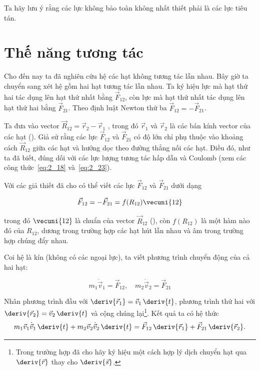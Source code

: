 Ta hãy lưu ý rằng các lực không bảo toàn không nhất thiết phải là các lực tiêu tán.

\section{Thế năng tương tác}\label{sec:3_6}

Cho đến nay ta đã nghiên cứu hệ các hạt không tương tác lẫn nhau. Bây giờ ta chuyển sang xét hệ gồm hai hạt tương tác lẫn nhau. Ta ký hiệu lực mà hạt thứ hai tác dụng lên hạt thứ nhất bằng $\vec{F}_{12}$, còn lực mà hạt thứ nhất tác dụng lên hạt thứ hai bằng $\vec{F}_{21}$. Theo định luật Newton thứ ba $\vec{F}_{12}=-\vec{F}_{21}$.

Ta đưa vào vector $\vec{R}_{12}=\vec{r}_2-\vec{r}_1$ , trong đó $\vec{r}_1$ và $\vec{r}_2$ là các bán kính vector của các hạt (). Giả sử rằng các lực $\vec{F}_{12}$ và $\vec{F}_{21}$ có độ lớn chỉ phụ thuộc vào khoảng cách $\vec{R}_12$ giữa các hạt và hướng dọc theo đường thẳng nối các hạt. Điều đó, như ta đã biết, đúng dối với các lực lượng tương tác hấp dẫn và Coulomb (xem các công thức~\eqref{eq:2_18} và~\eqref{eq:2_23}).

Với các giả thiết đã cho có thể viết các lực $\vec{F}_{12}$ và $\vec{F}_{21}$ dưới dạng 

\begin{equation}\label{eq:3_41}
\vec{F}_{12} = -\vec{F}_{21} = f(R_{12})\vecuni{12}
\end{equation}

\noindent
trong đó $\vecuni{12}$ là chuẩn của vector $\vec{R}_{12}$ (), còn $f(R_{12})$ là một hàm nào đó của $R_{12}$, dương trong trường hợp các hạt hút lẫn nhau và âm trong trường hợp chúng đẩy nhau.

Coi hệ là kín (không có các ngoại lực), ta viết phương trình chuyển động của cả hai hạt:

\begin{equation*}
m_1\dot{\vec{v}}_1 = \vec{F}_{12},\quad m_2\dot{\vec{v}}_2 = \vec{F}_{21}
\end{equation*}

\noindent
Nhân phương trình đầu với $\deriv{\vec{r}_1}=\vec{v}_1\,\deriv{t}$, phương trình thứ hai với $\deriv{\vec{r}_2}=\vec{v}_2\,\deriv{t}$ và cộng chúng lại\footnote{Trong trường hợp đã cho hãy ký hiệu một cách hợp lý dịch chuyển hạt qua $\deriv{\vec{r}}$ thay cho $\deriv{\vec{s}}$.}. Kết quả ta có hệ thức
\begin{equation}\label{eq:3_42}
m_1\vec{v}_1\dot{\vec{v}}_1\,\deriv{t} + m_2\vec{v}_2\dot{\vec{v}}_2\,\deriv{t} = \vec{F}_{12}\,\deriv{\vec{r}_1} + \vec{F}_{21}\,\deriv{\vec{r}_2}.
\end{equation}

